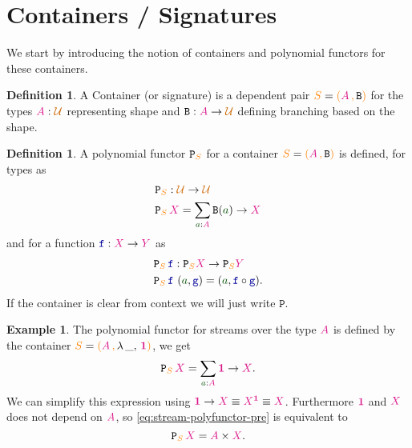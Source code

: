 \documentclass[twoside,11pt,openright]{report}
\theoremstyle{plain} %
\theoremstyle{definition}
\newtheorem{defn}[thm]{Definition}%
\newtheorem{exmp}{Example} %
\theoremstyle{remark}
\newcommand*{\term}[1]{\textcolor{green!30!black}{#1}} %
\newcommand*{\type}[1]{\textcolor{magenta!90!black}{#1}}
\newcommand*{\container}[1]{\textcolor{orange}{#1}}
\newcommand*{\containerpair}[2]{\ensuremath{\colorlet{savedleftcolor}{.}\color{orange}\left(\color{savedleftcolor}#1\,\textcolor{orange}{\mathbf{,}}\,#2\color{orange}\right)\color{savedleftcolor}}}
\newcommand*{\containerpairsimple}[2]{\containerpair{#1}{\lambda\,\_,\,#2}}
\newcommand*{\universe}[1]{\textcolor{orange!80!black}{#1}}
\newcommand*{\unit}{\type{\textbf{1}}}
\newcommand*{\function}[1]{\textcolor{blue!60!black}{\ensuremath{\mathtt{#1}}}}
\newcommand*{\typeformer}[1]{\ensuremath{\mathtt{#1}}}
\newcommand*{\functor}[1]{\ensuremath{\mathbf{\mathtt{#1}}}}
\begin{document}
\section{Containers / Signatures}
We start by introducing the notion of containers and polynomial functors for these containers.
\begin{defn}
  A Container (or signature) is a dependent pair \(\container{S} = \containerpair{\type{A}}{\typeformer{B}}\) for the types \(\type{A} : \universe{\mathcal{U}}\) representing shape and \(\typeformer{B} : \type{A} \rightarrow \universe{\mathcal{U}}\) defining branching based on the shape.
\end{defn}
\begin{defn}
  A polynomial functor \(\functor{P}_{\container{S}}\) for a container \(\container{S} = \containerpair{\type{A}}{\typeformer{B}}\) is defined, for types as
  \begin{equation}
    \begin{aligned}
      &\functor{P}_{\container{S}} : \universe{\mathcal{U}} \rightarrow \universe{\mathcal{U}} \\
      &\functor{P}_{\container{S}}\,\type{X} = \sum_{\term{a} : \type{A}} \typeformer{B}(\term{a}) \rightarrow \type{X}
    \end{aligned}
  \end{equation}
  and for a function \(\function{f} : \type{X} \rightarrow \type{Y}\) as
  \begin{equation}
    \begin{aligned}
      &\functor{P}_{\container{S}}\,\function{f} : \functor{P}_{\container{S}}\type{X} \rightarrow \functor{P}_{\container{S}}\type{Y} \\
      &\functor{P}_{\container{S}}\,\function{f}~(\term{a},\function{g}) = (\term{a}, \function{f} \circ \function{g}).
    \end{aligned}
  \end{equation}
  If the container is clear from context we will just write \(\functor{P}\).
\end{defn}
\begin{exmp}
  \label{exmp:stream-polyfunctor-example}
  The polynomial functor for streams over the type \(\type{A}\) is defined by the container \(\container{S} = \containerpairsimple{\type{A}}{\unit}\), we get
  \begin{equation}
    \label{eq:stream-polyfunctor-pre}
    \functor{P}_{\container{S}}\,\type{X} = \sum_{\term{a} : \type{A}} \unit \rightarrow \type{X}.
  \end{equation}
  We can simplify this expression using \(\unit \rightarrow \type{X} \equiv \type{X}^{\unit} \equiv \type{X}\). Furthermore \(\unit\) and \(\type{X}\) does not depend on \(\type{A}\), so \eqref{eq:stream-polyfunctor-pre} is equivalent to
  \begin{equation}
    \functor{P}_{\container{S}}\,\type{X} = \type{A} \times \type{X}.
  \end{equation}
\end{exmp}
\end{document}
